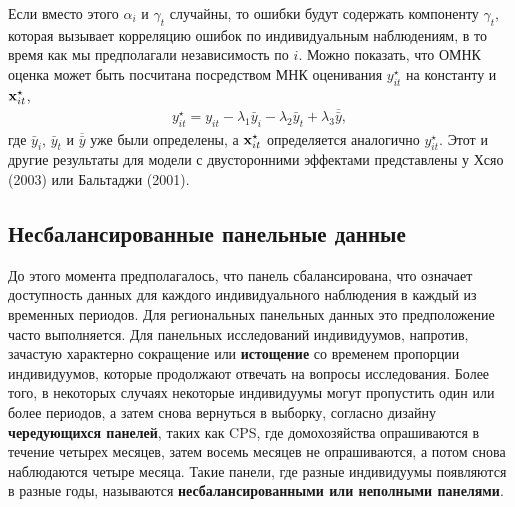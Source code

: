 Если вместо этого $\alpha_i$ и $\gamma_t$  случайны, то ошибки будут содержать компоненту $\gamma_t$, которая вызывает корреляцию ошибок по индивидуальным наблюдениям, в то время как мы предполагали независимость по $i$. Можно показать, что ОМНК оценка может быть посчитана посредством МНК оценивания $y^{\star}_{it}$ на константу и $\mathbf{x}_{it}^{\star}$,
 \begin{align}
 y_{it}^{\star}=y_{it}-\lambda_1\bar{y}_i-\lambda_2\bar{y}_t+\lambda_3\overline{\bar{y}},
\nonumber
\end{align}
где $\bar{y}_i$, $\bar{y}_t$ и $\overline{\bar{y}}$ уже были определены, а $\mathbf{x}^{\star}_{it}$ определяется аналогично $y^{\star}_{it}$. Этот и другие результаты для модели с двусторонними эффектами представлены у Хсяо (2003) или Бальтаджи (2001). 

\subsection{Несбалансированные панельные данные}

До этого момента предполагалось, что панель сбалансирована, что означает доступность данных для каждого индивидуального наблюдения в каждый из временных периодов. Для региональных панельных данных это предположение часто выполняется. Для панельных исследований индивидуумов, напротив, зачастую характерно сокращение или \textbf{истощение} со временем пропорции индивидуумов, которые продолжают отвечать на вопросы исследования. Более того,  в некоторых случаях некоторые индивидуумы могут пропустить один или более периодов, а затем снова вернуться в выборку, согласно  дизайну \textbf{чередующихся панелей}, таких как CPS, где домохозяйства опрашиваются в течение четырех месяцев, затем восемь месяцев не опрашиваются, а потом снова наблюдаются четыре месяца. Такие панели, где разные индивидуумы появляются в разные годы, называются \textbf{несбалансированными или неполными панелями}.

